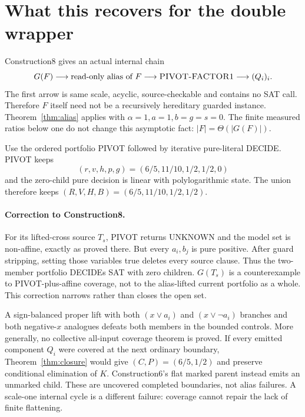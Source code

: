 \documentclass[11pt]{article}
\begin{document}
\section{What this recovers for the double wrapper}
Construction8 gives an actual internal chain
\[
 G(F)\longrightarrow \text{read-only alias of }F
 \longrightarrow \textsc{PIVOT-FACTOR1}
 \longrightarrow (Q_i)_i.
\]
The first arrow is same scale, acyclic, source-checkable and contains no SAT
call.  Therefore $F$ itself need not be a recursively hereditary guarded
instance.  Theorem~\ref{thm:alias} applies with
$\alpha=1,a=1,b=g=s=0$.  The finite measured ratios below one do not change
this asymptotic fact: $|F|=\Theta(|G(F)|)$.

Use the ordered portfolio PIVOT followed by iterative pure-literal DECIDE.
PIVOT keeps
\[
 (r,v,h,p,g)=(6/5,11/10,1/2,1/2,0)
\]
and the zero-child pure decision is linear with polylogarithmic state.
The union therefore keeps $(R,V,H,B)=(6/5,11/10,1/2,1/2)$.

\paragraph{Correction to Construction8.}
For its lifted-cross source $T_s$, PIVOT returns UNKNOWN and the model set is
non-affine, exactly as proved there.  But every $a_i,b_j$ is pure positive.
After guard stripping, setting those variables true deletes every source
clause.  Thus the two-member portfolio DECIDEs SAT with zero children.
$G(T_s)$ is a counterexample to PIVOT-plus-affine coverage, not to the
alias-lifted current portfolio as a whole.  This correction narrows rather
than closes the open set.

A sign-balanced proper lift with both $(x\vee a_i)$ and
$(x\vee\neg a_i)$ branches and both negative-$x$ analogues defeats both
members in the bounded controls.  More generally, no collective all-input
coverage theorem is proved.  If every emitted component $Q_i$ were covered
at the next ordinary boundary, Theorem~\ref{thm:closure} would give
$(C,P)=(6/5,1/2)$ and preserve conditional elimination of $K$.  Construction6's
flat marked parent instead emits an unmarked child.  These are uncovered
completed boundaries, not alias failures.  A scale-one internal cycle is a
different failure: coverage cannot repair the lack of finite flattening.
\end{document}

